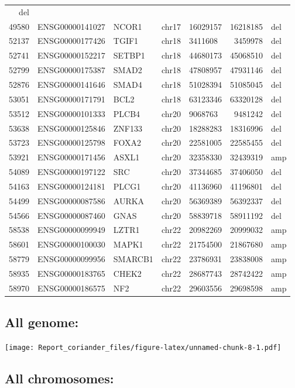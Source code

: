 \documentclass[]{article}
\begin{document}
\begin{longtable}[]{@{}rrlrlrl@{}}
del\tabularnewline
49580 & ENSG00000141027 & NCOR1 & chr17 & 16029157 & 16218185 &
del\tabularnewline
52137 & ENSG00000177426 & TGIF1 & chr18 & 3411608 & 3459978 &
del\tabularnewline
52741 & ENSG00000152217 & SETBP1 & chr18 & 44680173 & 45068510 &
del\tabularnewline
52799 & ENSG00000175387 & SMAD2 & chr18 & 47808957 & 47931146 &
del\tabularnewline
52876 & ENSG00000141646 & SMAD4 & chr18 & 51028394 & 51085045 &
del\tabularnewline
53051 & ENSG00000171791 & BCL2 & chr18 & 63123346 & 63320128 &
del\tabularnewline
53512 & ENSG00000101333 & PLCB4 & chr20 & 9068763 & 9481242 &
del\tabularnewline
53638 & ENSG00000125846 & ZNF133 & chr20 & 18288283 & 18316996 &
del\tabularnewline
53723 & ENSG00000125798 & FOXA2 & chr20 & 22581005 & 22585455 &
del\tabularnewline
53921 & ENSG00000171456 & ASXL1 & chr20 & 32358330 & 32439319 &
amp\tabularnewline
54089 & ENSG00000197122 & SRC & chr20 & 37344685 & 37406050 &
del\tabularnewline
54163 & ENSG00000124181 & PLCG1 & chr20 & 41136960 & 41196801 &
del\tabularnewline
54499 & ENSG00000087586 & AURKA & chr20 & 56369389 & 56392337 &
del\tabularnewline
54566 & ENSG00000087460 & GNAS & chr20 & 58839718 & 58911192 &
del\tabularnewline
58538 & ENSG00000099949 & LZTR1 & chr22 & 20982269 & 20999032 &
amp\tabularnewline
58601 & ENSG00000100030 & MAPK1 & chr22 & 21754500 & 21867680 &
amp\tabularnewline
58779 & ENSG00000099956 & SMARCB1 & chr22 & 23786931 & 23838008 &
amp\tabularnewline
58935 & ENSG00000183765 & CHEK2 & chr22 & 28687743 & 28742422 &
amp\tabularnewline
58970 & ENSG00000186575 & NF2 & chr22 & 29603556 & 29698598 &
amp\tabularnewline
\bottomrule
\end{longtable}

\hypertarget{all-genome}{%
\subsection{All genome:}\label{all-genome}}

\texttt{[image: Report\_coriander\_files/figure-latex/unnamed-chunk-8-1.pdf]}

\hypertarget{all-chromosomes}{%
\subsection{All chromosomes:}\label{all-chromosomes}}
\end{document}
